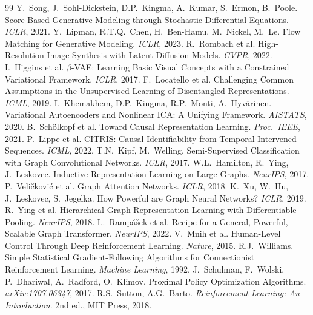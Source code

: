 \documentclass[11pt,a4paper,openany]{book}
\theoremstyle{definition}
\begin{document}
\begin{thebibliography}{99}
 Y.\ Song, J.\ Sohl-Dickstein, D.P.\ Kingma, A.\ Kumar, S.\ Ermon, B.\ Poole. Score-Based Generative Modeling through Stochastic Differential Equations. \textit{ICLR}, 2021.
 Y.\ Lipman, R.T.Q.\ Chen, H.\ Ben-Hamu, M.\ Nickel, M.\ Le. Flow Matching for Generative Modeling. \textit{ICLR}, 2023.
 R.\ Rombach et al. High-Resolution Image Synthesis with Latent Diffusion Models. \textit{CVPR}, 2022.
 I.\ Higgins et al. $\beta$-VAE: Learning Basic Visual Concepts with a Constrained Variational Framework. \textit{ICLR}, 2017.
 F.\ Locatello et al. Challenging Common Assumptions in the Unsupervised Learning of Disentangled Representations. \textit{ICML}, 2019.
 I.\ Khemakhem, D.P.\ Kingma, R.P.\ Monti, A.\ Hyvärinen. Variational Autoencoders and Nonlinear ICA: A Unifying Framework. \textit{AISTATS}, 2020.
 B.\ Schölkopf et al. Toward Causal Representation Learning. \textit{Proc.\ IEEE}, 2021.
 P.\ Lippe et al. CITRIS: Causal Identifiability from Temporal Intervened Sequences. \textit{ICML}, 2022.
 T.N.\ Kipf, M.\ Welling. Semi-Supervised Classification with Graph Convolutional Networks. \textit{ICLR}, 2017.
 W.L.\ Hamilton, R.\ Ying, J.\ Leskovec. Inductive Representation Learning on Large Graphs. \textit{NeurIPS}, 2017.
 P.\ Veličković et al. Graph Attention Networks. \textit{ICLR}, 2018.
 K.\ Xu, W.\ Hu, J.\ Leskovec, S.\ Jegelka. How Powerful are Graph Neural Networks? \textit{ICLR}, 2019.
 R.\ Ying et al. Hierarchical Graph Representation Learning with Differentiable Pooling. \textit{NeurIPS}, 2018.
 L.\ Rampášek et al. Recipe for a General, Powerful, Scalable Graph Transformer. \textit{NeurIPS}, 2022.
 V.\ Mnih et al. Human-Level Control Through Deep Reinforcement Learning. \textit{Nature}, 2015.
 R.J.\ Williams. Simple Statistical Gradient-Following Algorithms for Connectionist Reinforcement Learning. \textit{Machine Learning}, 1992.
 J.\ Schulman, F.\ Wolski, P.\ Dhariwal, A.\ Radford, O.\ Klimov. Proximal Policy Optimization Algorithms. \textit{arXiv:1707.06347}, 2017.
 R.S.\ Sutton, A.G.\ Barto. \textit{Reinforcement Learning: An Introduction}. 2nd ed., MIT Press, 2018.
\end{thebibliography}
\end{document}
